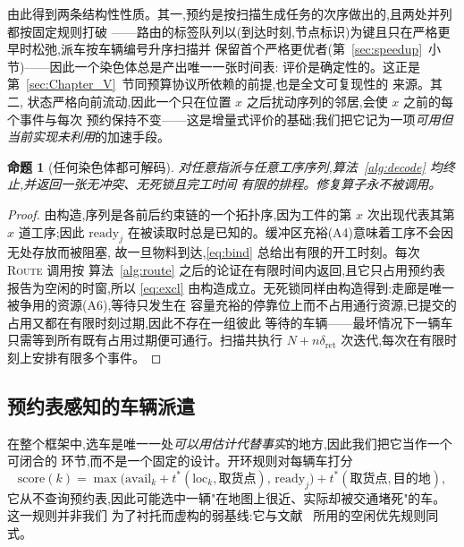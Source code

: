 \documentclass[manuscript,screen,review]{acmart}
\newtheorem{prop}{命题}
\begin{document}
由此得到两条结构性性质。其一,预约是按扫描生成任务的次序做出的,且两处并列都按固定规则打破
——路由的标签队列以(到达时刻,节点标识)为键且只在严格更早时松弛,派车按车辆编号升序扫描并
保留首个严格更优者(第~\ref{sec:speedup}~小节)——因此一个染色体总是产出唯一一张时间表:
评价是确定性的。这正是第~\ref{sec:Chapter_V}~节同预算协议所依赖的前提,也是全文可复现性的
来源。其二,
状态严格向前流动,因此一个只在位置 $x$ 之后扰动序列的邻居,会使 $x$ 之前的每个事件与每次
预约保持不变——这是增量式评价的基础;我们把它记为一项\emph{可用但当前实现未利用}的加速手段。

\begin{prop}[任何染色体都可解码]
\label{prop:decodable}
对任意指派与任意工序序列,算法~\ref{alg:decode} 均终止,并返回一张无冲突、无死锁且完工时间
有限的排程。修复算子永不被调用。
\end{prop}

\begin{proof}
由构造,序列是各前后约束链的一个拓扑序,因为工件的第 $x$ 次出现代表其第 $x$ 道工序;因此
$\mathrm{ready}_j$ 在被读取时总是已知的。缓冲区充裕(A4)意味着工序不会因无处存放而被阻塞,
故一旦物料到达,\eqref{eq:bind} 总给出有限的开工时刻。每次 \textsc{Route} 调用按
算法~\ref{alg:route} 之后的论证在有限时间内返回,且它只占用预约表报告为空闲的时窗,所以
\eqref{eq:excl} 由构造成立。无死锁同样由构造得到:走廊是唯一被争用的资源(A6),等待只发生在
容量充裕的停靠位上而不占用通行资源,已提交的占用又都在有限时刻过期,因此不存在一组彼此
等待的车辆——最坏情况下一辆车只需等到所有既有占用过期便可通行。扫描共执行
$N+n\delta_{\mathrm{ret}}$ 次迭代,每次在有限时刻上安排有限多个事件。
\end{proof}

\subsection{预约表感知的车辆派遣}
\label{sec:dispatch}

在整个框架中,选车是唯一一处\emph{可以用估计代替事实}的地方,因此我们把它当作一个可闭合的
环节,而不是一个固定的设计。开环规则对每辆车打分
\begin{equation}
\label{eq:rule}
\mathrm{score}(k)=\max\bigl(\mathrm{avail}_k+t^{*}(\mathrm{loc}_k,\text{取货点}),\,
\mathrm{ready}_j\bigr)+t^{*}(\text{取货点},\text{目的地}),
\end{equation}
它从不查询预约表,因此可能选中一辆"在地图上很近、实际却被交通堵死"的车。这一规则并非我们
为了衬托而虚构的弱基线:它与文献~\cite{li2026framework} 所用的空闲优先规则同式。
\end{document}
